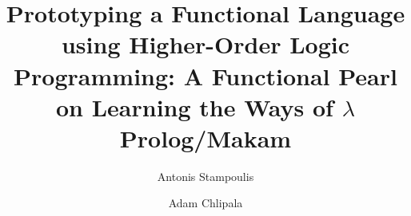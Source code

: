 \documentclass[acmsmall,screen]{acmart}
\begin{document}
\title[Prototyping a Functional Language using Higher-Order Logic Programming]{Prototyping a Functional Language using Higher-Order Logic Programming: A Functional Pearl on Learning the Ways of $\lambda$Prolog/Makam}

\author{Antonis Stampoulis}

\author{Adam Chlipala}

\newcommand\TODO[0]{\textbf{TODO}}
\newcommand\lamprolog[0]{\foreignlanguage{greek}{λ}Prolog\xspace}
\newcommand\fomega[0]{F$\omega$\xspace}


\newcommand\colorone[1]{\textcolor[HTML]{006000}{#1}} %
\newcommand\colortwo[1]{\textcolor[HTML]{a10000}{#1}} %
\newcommand\colorthree[1]{\textcolor[HTML]{05297D}{#1}} %
\newcommand\colorfour[1]{\textcolor[HTML]{7013ab}{#1}} %

\newsavebox{\selvestebox}
\newtoggle{important}
\togglefalse{important}
\newcommand\importantCodeblock[0]{\toggletrue{important}}
\newcommand\importantCodeblockEnd[0]{\togglefalse{important}}
\renewenvironment{verbatim}{\iftoggle{important}{\newenvironment{colbox}{\begin{lrbox}{\selvestebox}%
   \begin{minipage}{\dimexpr\columnwidth}}{\end{minipage}\end{lrbox}%
   \begin{center}\hspace{-6pt}%
   \colorbox{accentbgcolor}{\usebox{\selvestebox}}%
   \end{center}}}{\newenvironment{colbox}{}{}}%
\begin{colbox}\begin{quote}\begin{alltt}}{\end{alltt}\end{quote}\end{colbox}}
\newcommand\highlightedtext[1]{{\setlength{\fboxsep}{2pt}\colorbox{accentbgcolor}{#1}}}
\end{document}

